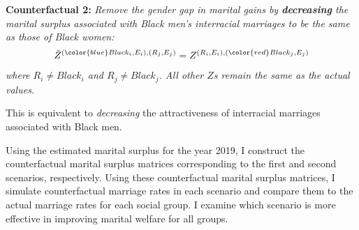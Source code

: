 \vspace{2mm}
\noindent \textbf{Counterfactual 2:} \textit{Remove the gender gap in marital gains  by \textbf{decreasing} the marital surplus associated with Black men's interracial marriages to be the same as those of Black women: }
\begin{align}
	\tilde{Z}^{({\color{blue}Black_i}, E_i), (R_j, E_j)} = Z^{(R_i, E_i), ({\color{red}Black_j}, E_j)} \label{eq:cf2gendergap}
\end{align}
\textit{where $R_i \neq Black_i$ and $R_j \neq Black_j$. All other $Z$s remain the same as the actual values.} 

\noindent This is equivalent to \textit{decreasing} the attractiveness of interracial marriages associated with Black men.

Using the estimated marital surplus for the year 2019, I construct the counterfactual marital surplus matrices corresponding to the first and second scenarios, respectively. Using these counterfactual marital surplus matrices, I simulate counterfactual marriage rates in each scenario and compare them to the actual marriage rates for each social group. I examine which scenario is more effective in improving marital welfare for all groups. 


\vspace{2mm}

